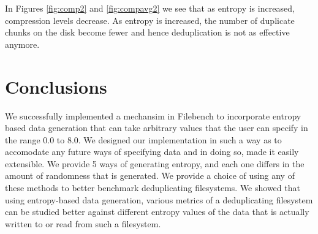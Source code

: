 In Figures \ref{fig:comp2} and \ref{fig:compavg2} we see that as entropy is increased, compression levels decrease. As entropy is increased, the number of duplicate chunks on the disk become fewer and hence deduplication is not as effective anymore.

\chapter{Conclusions}\label{chap:conc}
\noindent We successfully implemented a mechansim in Filebench to incorporate entropy based data generation that can take arbitrary values that the user can specify in the range 0.0 to 8.0. We designed our implementation in such a way as to accomodate any future ways of specifying data and in doing so, made it easily extensible. We provide 5 ways of generating entropy, and each one differs in the amount of randomness that is generated. We provide a choice of using any of these methods to better benchmark deduplicating filesystems.
\newline\newline
\noindent We showed that using entropy-based data generation, various metrics of a deduplicating filesystem can be studied better against different entropy values of the data that is actually written to or read from such a filesystem.

